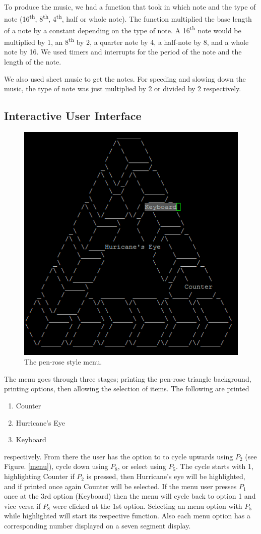 \documentclass[12pt]{article}
\begin{document}
To produce the music, we had a function that took in which note and the type of note (\num{16}\textsuperscript{th}, \num{8}\textsuperscript{th}, \num{4}\textsuperscript{th}, half or whole note). The function multiplied the base length of a note by a constant depending on the type of note. A \num{16}\textsuperscript{th} note would be multiplied by \num{1}, an \num{8}\textsuperscript{th} by \num{2}, a quarter note by \num{4}, a half-note by \num{8}, and a whole note by \num{16}. We used timers and interrupts for the period of the note and the length of the note.

We also used sheet music to get the notes. For speeding and slowing down the music, the type of note was just multiplied by \num{2} or divided by \num{2} respectively.

\subsection{Interactive User Interface}

\begin{figure}[!ht]
    \centering
    \includegraphics[width=.5\textwidth]{assets/menu}
    \caption{The pen-rose style menu.}
    \label{penrose}
\end{figure}

The menu goes through three stages; printing the pen-rose triangle background, printing options, then allowing the selection of items. The following are printed

\begin{enumerate}
    \item Counter
    \item Hurricane's Eye
    \item Keyboard
\end{enumerate}

\noindent respectively. From there the user has the option to to cycle upwards using $P_2$ (see Figure. \ref{menu}), cycle down using $P_8$, or select using $P_5$. The cycle starts with \num{1}, highlighting Counter if $P_2$ is pressed, then Hurricane's eye will be highlighted, and if printed once again Counter will be selected. If the menu user presses $P_1$ once at the 3rd option (Keyboard) then the menu will cycle back to option \num{1} and vice versa if $P_8$ were clicked at the 1st option. Selecting an menu option with $P_5$ while highlighted will start its respective function. Also each menu option has a corresponding number displayed on a seven segment display.
\end{document}
